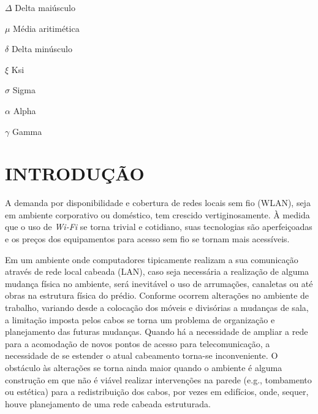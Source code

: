 \documentclass[
	12pt,				%
	twoside,			%
	a4paper,			%
	english,			%
	french,				%
	spanish,			%
	brazil				%
	]{abntex2}
\begin{document}
\begin{simbolos}
  \item[$ \Delta $] Delta maiúsculo
  \item[$ \mu $] Média aritimética
  \item[$ \delta $] Delta minúsculo
  \item[$ \xi $] Ksi
  \item[$ \sigma $] Sigma
  \item[$ \alpha $] Alpha
  \item[$ \gamma $] Gamma
\end{simbolos}
\tableofcontents*
\cleardoublepage


\textual

\chapter{INTRODUÇÃO}\label{introduuxe7uxe3o}

A demanda por disponibilidade e cobertura de redes locais sem fio
(WLAN), seja em ambiente corporativo ou doméstico, tem crescido
vertiginosamente. À medida que o uso de \emph{Wi-Fi} se torna trivial e
cotidiano, suas tecnologias são aperfeiçoadas e os preços dos
equipamentos para acesso sem fio se tornam mais
acessíveis\cite{MARQUES}.

Em um ambiente onde computadores tipicamente realizam a sua comunicação
através de rede local cabeada (LAN), caso seja necessária a realização
de alguma mudança física no ambiente, será inevitável o uso de
arrumações, canaletas ou até obras na estrutura física do prédio.
Conforme ocorrem alterações no ambiente de trabalho, variando desde a
colocação dos móveis e divisórias a mudanças de sala, a limitação
imposta pelos cabos se torna um problema de organização e planejamento
das futuras mudanças. Quando há a necessidade de ampliar a rede para a
acomodação de novos pontos de acesso para telecomunicação, a necessidade
de se estender o atual cabeamento torna-se inconveniente. O obstáculo às
alterações se torna ainda maior quando o ambiente é alguma construção em
que não é viável realizar intervenções na parede (e.g., tombamento ou
estética) para a redistribuição dos cabos, por vezes em edifícios, onde,
sequer, houve planejamento de uma rede cabeada estruturada.
\end{document}
